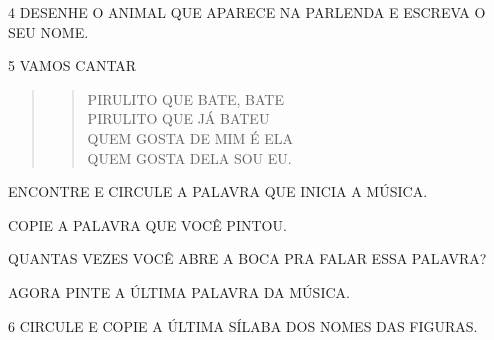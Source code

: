 \num{4} DESENHE O ANIMAL QUE APARECE NA PARLENDA E ESCREVA O SEU NOME.

\begin{mdframed}[linewidth=2pt,linecolor=salmao,roundcorner=2pt]
\vspace{12cm}
\end{mdframed}

\pagebreak
\num{5} VAMOS CANTAR


\begin{quote}
\begin{verse}
PIRULITO QUE BATE, BATE\\
PIRULITO QUE JÁ BATEU\\
QUEM GOSTA DE MIM É ELA\\
QUEM GOSTA DELA SOU EU.
\end{verse}
\end{quote}

\begin{escolha}
\item ENCONTRE E CIRCULE A PALAVRA QUE INICIA A MÚSICA.

\item COPIE A PALAVRA QUE VOCÊ PINTOU.

\item QUANTAS VEZES VOCÊ ABRE A BOCA PRA FALAR ESSA PALAVRA?


\item AGORA PINTE A ÚLTIMA PALAVRA DA MÚSICA.
\end{escolha}

\num{6} CIRCULE E COPIE A ÚLTIMA SÍLABA DOS NOMES DAS FIGURAS.


